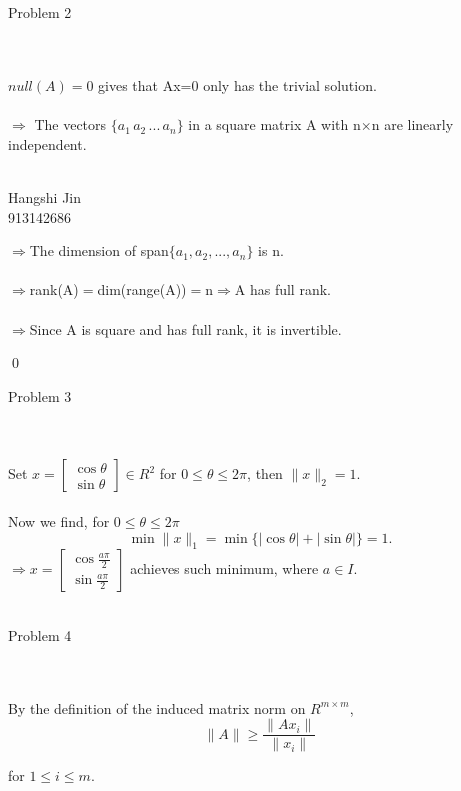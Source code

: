 \documentclass{article}
\begin{document}
\\\\\begin{large}Problem 2\end{large}
\\\\$null(A)={0}$ gives that Ax=0 only has the trivial solution. 
\\\\$\Rightarrow$ The vectors $\{a_1\, a_2\, ...\, a_n\}$ in a square matrix A with n$\times$n are linearly independent.
\\\\\begin{flushright}Hangshi Jin \\913142686\end{flushright}
$\Rightarrow$The dimension of span$\{a_1, a_2, ..., a_n\}$ is n.
\\\\$\Rightarrow$rank(A)$=$dim(range(A))$=$n$\Rightarrow$A has full rank.
\\\\$\Rightarrow$Since A is square and has full rank, it is invertible.\begin{flushright}\qed\end{flushright}
\begin{large}Problem 3\end{large}
\\\\Set $x=\begin{bmatrix}\cos\theta\\\sin\theta\end{bmatrix}\in R^2$ for $0\leq\theta\leq2\pi$, then $\lVert x\rVert_2=1$. 
\\\\Now we find, for $0\leq\theta\leq2\pi$\[\min\lVert x\rVert_1=\min\{|\cos\theta|+|\sin\theta|\}=1.\]
$\Rightarrow x=\begin{bmatrix}\cos\frac{a\pi}{2}\\\sin\frac{a\pi}{2}\end{bmatrix}$ achieves such minimum, where $a\in I$.
\\\\\begin{large}Problem 4\end{large}
\\\\By the definition of the induced matrix norm on $R^{m\times m}$,\[\lVert A\rVert\geq\frac{\lVert Ax_i\rVert}{\lVert x_i\rVert}\]\begin{flushright}for $1\leq i\leq m$.\end{flushright}
\end{document}

